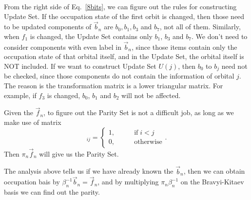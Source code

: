 From the right side of Eq.~\ref{8bits}, we can figure out the rules for constructing Update Set. If the occupation state of the first orbit is changed, then those need to be updated components of $\vec{b}_n$ are $b_0, b_1, b_3$ and $b_7$, not all of them. Similarly, when $f_1$ is changed, the Update Set contains only $b_1$, $b_3$ and $b_7$. We don't need to consider components with even label in $\vec{b}_n$, since those items contain only the occupation state of that orbital itself, and in the Update Set, the orbital itself is NOT included. If we want to construct Update Set $U(j)$, then $b_0$ to $b_j$ need not be checked, since those components do not contain the information of orbital $j$. The reason is the transformation matrix is a lower triangular matrix. For example, if $f_3$ is changed, $b_0$, $b_1$ and $b_2$ will not be affected.

Given the $\vec{f}_n$, to figure out the Parity Set is not a difficult job, as long as we make use of matrix
\begin{equation}
    [\pi_n]_{ij}=\begin{cases}
        1, & \qquad \text{if} \; i<j \\
        0, & \qquad \text{otherwise}
    \end{cases}.
\end{equation}
Then $\pi_n \vec{f}_n$ will give us the Parity Set.

The analysis above tells us if we have already known the $\vec{b}_n$, then we can obtain occupation bais by $\beta_n^{-1}\vec{b}_n=\vec{f}_n$, and by multiplying $\pi_n\beta_n^{-1}$ on the Bravyi-Kitaev basis we can find out the parity.


